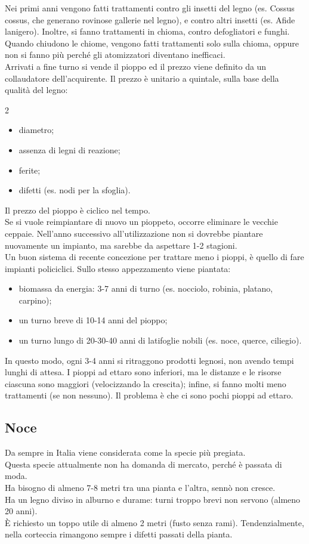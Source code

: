 Nei primi anni vengono fatti trattamenti contro gli insetti del legno (es. Cossus cossus, che generano rovinose gallerie nel legno), e contro altri insetti (es. Afide lanigero). Inoltre, si fanno trattamenti in chioma, contro defogliatori e funghi.\\
Quando chiudono le chiome, vengono fatti trattamenti solo sulla chioma, oppure non si fanno più perché gli atomizzatori diventano inefficaci.\\
Arrivati a fine turno si vende il pioppo ed il prezzo viene definito da un collaudatore dell'acquirente. Il prezzo è unitario a quintale, sulla base della qualità del legno:
\begin{multicols}{2}
\begin{itemize}[nosep]
    \item diametro;
    \item assenza di legni di reazione;
    \item ferite;
    \item difetti (es. nodi per la sfoglia).
\end{itemize}  
\end{multicols}
Il prezzo del pioppo è ciclico nel tempo.\\
Se si vuole reimpiantare di nuovo un pioppeto, occorre eliminare le vecchie ceppaie. Nell'anno successivo all'utilizzazione non si dovrebbe piantare nuovamente un impianto, ma sarebbe da aspettare 1-2 stagioni.\\
Un buon sistema di recente concezione per trattare meno i pioppi, è quello di fare impianti policiclici. Sullo stesso appezzamento viene piantata:
\begin{itemize}[nosep]
\item biomassa da energia: 3-7 anni di turno (es. nocciolo, robinia, platano, carpino);
\item un turno breve di 10-14 anni del pioppo;
\item un turno lungo di 20-30-40 anni di latifoglie nobili (es. noce, querce, ciliegio). 
\end{itemize}
In questo modo, ogni 3-4 anni si ritraggono prodotti legnosi, non avendo tempi lunghi di attesa. I pioppi ad ettaro sono inferiori, ma le distanze e le risorse ciascuna sono maggiori (velocizzando la crescita); infine, si fanno molti meno trattamenti (se non nessuno). Il problema è che ci sono pochi pioppi ad ettaro.
\subsection{Noce}
Da sempre in Italia viene considerata come la specie più pregiata.\\
Questa specie attualmente non ha domanda di mercato, perché è passata di moda.\\
Ha bisogno di almeno 7-8 metri tra una pianta e l'altra, sennò non cresce.\\
Ha un legno diviso in alburno e durame: turni troppo brevi non servono (almeno 20 anni).\\
È richiesto un toppo utile di almeno 2 metri (fusto senza rami). Tendenzialmente, nella corteccia rimangono sempre i difetti passati della pianta.  
